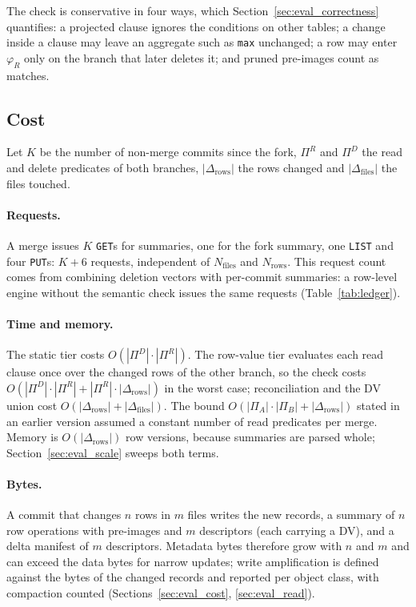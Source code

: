 \documentclass[sigconf, nonacm]{acmart}
\begin{document}
The check is conservative in four ways, which Section~\ref{sec:eval_correctness} quantifies: a projected clause ignores the conditions on other tables; a change inside a clause may leave an aggregate such as \texttt{max} unchanged; a row may enter $\varphi_R$ only on the branch that later deletes it; and pruned pre-images count as matches.

\subsection{Cost}
\label{sec:correctness_complexity}

Let $K$ be the number of non-merge commits since the fork, $\Pi^R$ and $\Pi^D$ the read and delete predicates of both branches, $|\Delta_{\text{rows}}|$ the rows changed and $|\Delta_{\text{files}}|$ the files touched.

\paragraph{Requests.} A merge issues $K$ \texttt{GET}s for summaries, one for the fork summary, one \texttt{LIST} and four \texttt{PUT}s: $K + 6$ requests, independent of $N_{\text{files}}$ and $N_{\text{rows}}$. This request count comes from combining deletion vectors with per-commit summaries: a row-level engine without the semantic check issues the same requests (Table~\ref{tab:ledger}).

\paragraph{Time and memory.} The static tier costs $O(|\Pi^D| \cdot |\Pi^R|)$. The row-value tier evaluates each read clause once over the changed rows of the other branch, so the check costs $O(|\Pi^D| \cdot |\Pi^R| + |\Pi^R| \cdot |\Delta_{\text{rows}}|)$ in the worst case; reconciliation and the DV union cost $O(|\Delta_{\text{rows}}| + |\Delta_{\text{files}}|)$. The bound $O(|\Pi_A| \cdot |\Pi_B| + |\Delta_{\text{rows}}|)$ stated in an earlier version assumed a constant number of read predicates per merge. Memory is $O(|\Delta_{\text{rows}}|)$ row versions, because summaries are parsed whole; Section~\ref{sec:eval_scale} sweeps both terms.

\paragraph{Bytes.} A commit that changes $n$ rows in $m$ files writes the new records, a summary of $n$ row operations with pre-images and $m$ descriptors (each carrying a DV), and a delta manifest of $m$ descriptors. Metadata bytes therefore grow with $n$ and $m$ and can exceed the data bytes for narrow updates; write amplification is defined against the bytes of the changed records and reported per object class, with compaction counted (Sections~\ref{sec:eval_cost}, \ref{sec:eval_read}).
\end{document}
